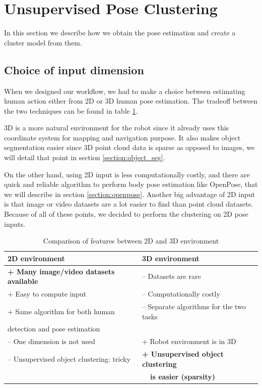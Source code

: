 \section{Unsupervised Pose Clustering}
In this section we describe how we obtain the pose estimation and create a cluster model from them.

\subsection{Choice of input dimension}
When we designed our workflow, we had to make a choice between estimating human action either from 2D or 3D human pose estimation. The tradeoff between the two techniques can be found in table \ref{tab:dimension_comparison}.

3D is a more natural environment for the robot since it already uses this coordinate system for mapping and navigation purpose. It also makes object segmentation easier since 3D point cloud data is sparse as opposed to images, we will detail that point in section \ref{section:object_seg}.

On the other hand, using 2D input is less computationally costly, and there are quick and reliable algorithm to perform body pose estimation like OpenPose, that we will describe in section \ref{section:openpose}. Another big advantage of 2D input is that image or video datasets are a lot easier to find than point cloud datasets. Because of all of these points, we decided to perform the clustering on 2D pose inputs.

\begin{table}[h]
    \centering
    \caption{Comparison of features between 2D and 3D environment}
    \label{tab:dimension_comparison}
    \begin{tabular}{|l|l|}
        \hline
        2D environment & 3D environment \\ \hline
        \textbf{+ Many image/video datasets available} & -- Datasets are rare \\
        + Easy to compute input & -- Computationally costly \\
        + Same algorithm for both human & -- Separate algorithms for the two tasks \\ detection and pose estimation & \\
        -- One dimension is not used & + Robot environment is in 3D \\
        -- Unsupervised object clustering: tricky & \textbf{+ Unsupervised object clustering} \\
        & \textbf{~~is easier (sparsity)}
        \\ \hline
    \end{tabular}
\end{table}

